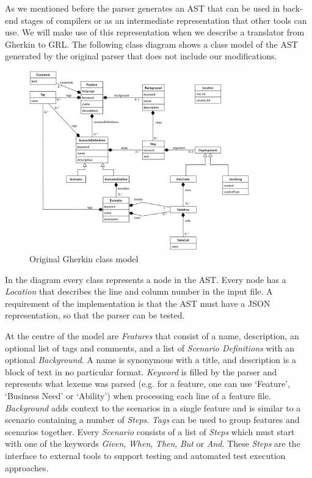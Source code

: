 \documentclass[dissertation,final]{softeng}
\begin{document}
As we mentioned before the parser generates an AST that can be used in back-end stages of compilers or as an intermediate representation that other tools can use. We will make use of this representation when we describe a translator from Gherkin to GRL. The following class diagram shows a class model of the AST generated by the original parser that does not include our modifications.

\begin{figure}[h!]
\includegraphics[width=0.85\textwidth]{gherkin3_ast}
\centering
\caption[Original Gherkin class model]{Original Gherkin class model~\footnotemark}
\label{fig:gherkin_ast}
\end{figure}

In the diagram every class represents a node in the AST. Every node has a \emph{Location} that describes the line and column number in the input file. A requirement of the implementation is that the AST must have a JSON representation, so that the parser can be tested.

At the centre of the model are \emph{Features} that consist of a name, description, an optional list of tags and comments, and a list of \emph{Scenario Definitions} with an optional \emph{Background}. A name is synonymous with a title, and description is a block of text in no particular format. \emph{Keyword} is filled by the parser and represents what lexeme was parsed (e.g. for a feature, one can use `Feature', `Business Need' or `Ability') when processing each line of a feature file. \emph{Background} adds context to the scenarios in a single feature and is similar to a scenario containing a number of \emph{Steps}. \emph{Tags} can be used to group features and scenarios together. Every \emph{Scenario} consists of a list of \emph{Steps} which must start with one of the keywords \emph{Given}, \emph{When}, \emph{Then}, \emph{But} or \emph{And}. These \emph{Steps} are the interface to external tools to support testing and automated test execution approaches.
\clearpage
\end{document}

